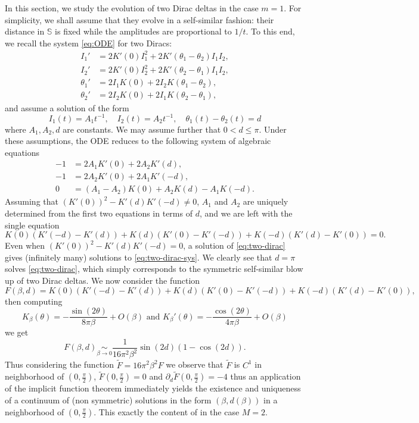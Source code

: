 \documentclass[10pt]{article}
\theoremstyle{definition}
\theoremstyle{remark}
\numberwithin{equation}{section}
\newcommand{\0}{\emptyset}
\newcommand{\tht}{\theta}
\newcommand{\bbS}{\mathbb S}
\begin{document}
    In this section, we study the evolution of two Dirac deltas in the case $m=1$. For simplicity, we shall assume that they evolve in a self-similar fashion: their distance in $\bbS$ is fixed while the amplitudes are proportional to $1/t$. To this end, we recall the system \eqref{eq:ODE} for two Diracs: \begin{equation*}
	\begin{split}
		I_1' &= 2K'(0) I_1^2 + 2K'(\tht_1-\tht_2) I_1 I_2, \\
		I_2' &= 2K'(0) I_2^2 + 2K'(\tht_2-\tht_1) I_1 I_2, \\
		\tht_1 ' &= 2I_1 K(0) + 2I_2 K(\tht_1-\tht_2), \\
		\tht_2' &= 2I_2 K(0) + 2I_1 K(\tht_2-\tht_1), 
	\end{split}
\end{equation*} and assume a solution of the form \begin{equation*}
     I_1(t)=A_1 t^{-1}, \quad I_2(t)=A_2t^{-1},\quad \tht_1(t)-\tht_2(t) = d
\end{equation*} where $A_1,A_2,d$ are constants. We may assume further that $0<d\le \pi$. Under these assumptions, the ODE reduces to the following system of algebraic equations \begin{equation}\label{eq:two-dirac-sys}
	\begin{split}
		-1 &= 2A_1 K'(0) + 2A_{2} K'(d), \\
            -1 &= 2A_{2} K'(0) + 2A_{1} K'(-d),\\
            0 & = (A_{1}-A_{2})K(0) + A_{2} K(d) - A_{1}K(-d). 
	\end{split}
\end{equation} Assuming that $(K'(0))^{2} - K'(d)K'(-d) \ne 0$, $A_{1}$ and $A_{2}$ are uniquely determined from the first two equations in terms of $d$, and we are left with the single equation \begin{equation}\label{eq:two-dirac}
    K(0)(  K'(-d)-K'(d)) + K(d)(K'(0)-K'(-d)) + K(-d)(K'(d)-K'(0)) = 0. 
\end{equation} Even when $(K'(0))^{2} - K'(d)K'(-d) = 0$, a solution of \eqref{eq:two-dirac} gives (infinitely many) solutions to \eqref{eq:two-dirac-sys}. We clearly see that $d=\pi$ solves \eqref{eq:two-dirac}, which simply corresponds to the symmetric self-similar blow up of two Dirac deltas. We now consider the function 
\[
F(\beta,d)=K(0)(  K'(-d)-K'(d)) + K(d)(K'(0)-K'(-d)) + K(-d)(K'(d)-K'(0)),
\]
then computing 
\[
K_{\beta}(\theta)= -\frac{\sin(2\theta)}{8\pi\beta}+O(\beta) \text{ and } K_{\beta}'(\theta)= -\frac{\cos(2\theta)}{4\pi\beta}+O(\beta)
\]
we get
\[
F(\beta,d)\underset{\beta \to 0}{\sim} \frac{1}{16\pi^2 \beta^2}\sin(2d)(1-\cos(2d)).
\]
Thus considering the function $\tilde{F}=16\pi^2 \beta^2 F$ we observe that $\tilde{F}$ is $C^1$ in neighborhood of $(0,\frac{\pi}{2})$, $\tilde{F}(0,\frac{\pi}{2})=0$ and $\partial_d\tilde{F}(0,\frac{\pi}{2})=-4$ thus an application of the implicit function theorem immediately yields the existence and uniqueness of a continuum of (non symmetric) solutions in the form $(\beta,d(\beta))$ in a neighborhood of $(0,\frac{\pi}{2})$. This exactly the content of \cite[Theorem 1]{CKW22} in the case $M=2$.
\end{document}
